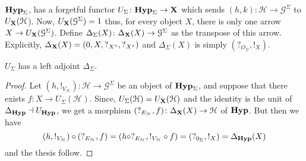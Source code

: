 \documentclass[runningheads,envcountsect]{lipics-v2021}
\newcommand{\lgh}{\mathsf{lg}}
\def\X{\textbf {\textup{X}}}
\newcommand{\catname}[1]{\textbf{\textup{#1}}}
\newcommand{\hyp}{\catname{Hyp}}
\newcommand{\ari}{\mathsf{ar}}
\begin{document}

$\hyp_{\Sigma}$, has a forgetful functor $U_{\Sigma}\colon \hyp_{\Sigma}\to \X$ which sends $(h,k)\colon \mathcal{H}\to \mathcal{G}^{\Sigma}$ to $U_{\X}(\mathcal{H}$). Now, $U_{\X}(\mathcal{G}^{\Sigma})=1$ thus, for every object $X$, there is only one arrow $X\to U_{\X}(\mathcal{G}^{\Sigma})$. Define $\Delta_{\Sigma}(X)\colon \Delta_{\X}(X)\to \mathcal{G}^{\Sigma}$ as the transpose of this arrow. Explicitly, $\Delta_{\X}(X)=(0, X, ?_{X^\star}, ?_{X^\star})$ and $\Delta_\Sigma(X)$ is simply $(?_{O_\Sigma}, !_{X})$.

\begin{proposition} $U_\Sigma$
	has a left adjoint $\Delta_\Sigma$.
\end{proposition}
\begin{proof}Let $(h, !_{V_\mathcal{H}})\colon \mathcal{H}\to \mathcal{G}^{\Sigma}$ be an object of $\hyp_{\Sigma}$, and suppose that there exists $f\colon X\to U_{\Sigma}(\mathcal{H})$. Since, $U_{\Sigma}(\mathcal{H})=U_{\X}(\mathcal{H})$ and the identity is the unit of $\Delta_\hyp \dashv U_{\hyp}$, we get a morphism $(?_{E_{\mathcal{H}}},f)\colon \Delta_{\X}(X)\to \mathcal{H}$ of $\hyp$. But then we have
	\[
	(h, !_{V_{\mathcal{{H}}}})\circ (?_{E_{\mathcal{H}}}, f)=(h\circ ?_{E_{\mathcal{H}}}, !_{V_{\mathcal{{H}}}}\circ f)=(?_{0_{\Sigma}}, !_{X})=\Delta_{\hyp}(X)\]
and the thesis follow.   
\end{proof}
\end{document}

